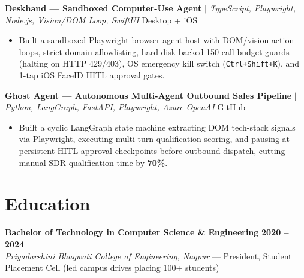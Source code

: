 \documentclass[a4paper,9pt]{article}
\begin{document}
\vspace{2pt}
\textbf{Deskhand --- Sandboxed Computer-Use Agent} $|$ \textit{TypeScript, Playwright, Node.js, Vision/DOM Loop, SwiftUI} \hfill Desktop + iOS
\begin{itemize}
    \item Built a sandboxed Playwright browser agent host with DOM/vision action loops, strict domain allowlisting, hard disk-backed 150-call budget guards (halting on HTTP 429/403), OS emergency kill switch (\texttt{Ctrl+Shift+K}), and 1-tap iOS FaceID HITL approval gates.
\end{itemize}

\vspace{2pt}
\textbf{Ghost Agent --- Autonomous Multi-Agent Outbound Sales Pipeline} $|$ \textit{Python, LangGraph, FastAPI, Playwright, Azure OpenAI} \hfill \href{https://github.com/harshalsawatkar}{GitHub}
\begin{itemize}
    \item Built a cyclic LangGraph state machine extracting DOM tech-stack signals via Playwright, executing multi-turn qualification scoring, and pausing at persistent HITL approval checkpoints before outbound dispatch, cutting manual SDR qualification time by \textbf{70\%}.
\end{itemize}

\section*{Education}
\textbf{Bachelor of Technology in Computer Science \& Engineering} \hfill \textbf{2020 -- 2024} \\
\textit{Priyadarshini Bhagwati College of Engineering, Nagpur} --- President, Student Placement Cell (led campus drives placing 100+ students)
\end{document}

